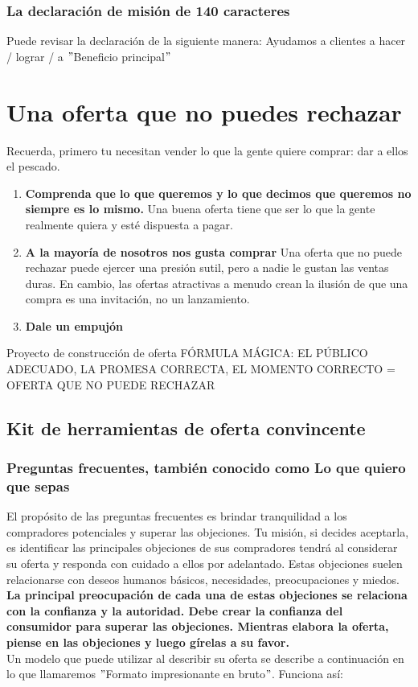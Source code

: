 \documentclass[10pt]{book}
\begin{document}
	    \subsection{La declaración de misión de 140 caracteres}
	    Puede revisar la declaración de la siguiente manera: Ayudamos a clientes a hacer / lograr / a $"$Beneficio principal$"$

    \chapter{Una oferta que no puedes rechazar}
	    Recuerda, primero tu necesitan vender lo que la gente quiere comprar: dar a ellos el pescado. 
	    \begin{enumerate}[\bfseries 1.]
		\item \textbf{Comprenda que lo que queremos y lo que decimos que queremos no siempre es lo mismo.} Una buena oferta tiene que ser lo que la gente realmente quiera y esté dispuesta a pagar.
		\item \textbf{A la mayoría de nosotros nos gusta comprar} Una oferta que no puede rechazar puede ejercer una presión sutil, pero a nadie le gustan las ventas duras. En cambio, las ofertas atractivas a menudo crean la ilusión de que una compra es una invitación, no un lanzamiento.
		\item \textbf{Dale un empujón} 
	    \end{enumerate}

	    \begin{center}
		Proyecto de construcción de oferta FÓRMULA MÁGICA: EL PÚBLICO ADECUADO, LA PROMESA CORRECTA, EL MOMENTO CORRECTO = OFERTA QUE NO PUEDE RECHAZAR
	    \end{center}

	    \section{Kit de herramientas de oferta convincente}

		\subsection{Preguntas frecuentes, también conocido como Lo que quiero que sepas}
		El propósito de las preguntas frecuentes es brindar tranquilidad a los compradores potenciales y superar las objeciones. Tu misión, si decides aceptarla, es identificar las principales objeciones de sus compradores tendrá al considerar su oferta y responda con cuidado a ellos por adelantado. Estas objeciones suelen relacionarse con deseos humanos básicos, necesidades, preocupaciones y miedos.\\
		\textbf{La principal preocupación de cada una de estas objeciones se relaciona con la confianza y la autoridad. Debe crear la confianza del consumidor para superar las objeciones. Mientras elabora la oferta, piense en las objeciones y luego gírelas a su favor.}\\
		Un modelo que puede utilizar al describir su oferta se describe a continuación en lo que llamaremos $"$Formato impresionante en bruto$"$. Funciona así:
\end{document}
